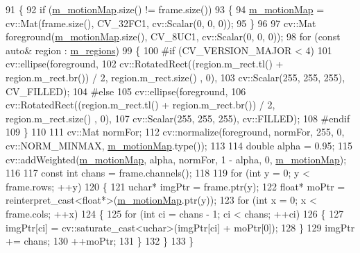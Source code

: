 \begin{DoxyCode}
91     \{
92         \textcolor{keywordflow}{if} (\mbox{\hyperlink{class_base_detector_a45a2d54a0b69e271aa5c44ee301682b7}{m\_motionMap}}.size() != frame.size())
93         \{
94             \mbox{\hyperlink{class_base_detector_a45a2d54a0b69e271aa5c44ee301682b7}{m\_motionMap}} = cv::Mat(frame.size(), CV\_32FC1, cv::Scalar(0, 0, 0));
95         \}
96 
97         cv::Mat foreground(\mbox{\hyperlink{class_base_detector_a45a2d54a0b69e271aa5c44ee301682b7}{m\_motionMap}}.size(), CV\_8UC1, cv::Scalar(0, 0, 0));
98         \textcolor{keywordflow}{for} (\textcolor{keyword}{const} \textcolor{keyword}{auto}& region : \mbox{\hyperlink{class_base_detector_a409c20093acba261db8354ca72058fce}{m\_regions}})
99         \{
100 \textcolor{preprocessor}{#if (CV\_VERSION\_MAJOR < 4)}
101             cv::ellipse(foreground,
102                         cv::RotatedRect((region.m\_rect.tl() + region.m\_rect.br()) / 2, region.m\_rect.size()
      , 0),
103                                         cv::Scalar(255, 255, 255), CV\_FILLED);
104 \textcolor{preprocessor}{#else}
105             cv::ellipse(foreground,
106                         cv::RotatedRect((region.m\_rect.tl() + region.m\_rect.br()) / 2, region.m\_rect.size()
      , 0),
107                                         cv::Scalar(255, 255, 255), cv::FILLED);
108 \textcolor{preprocessor}{#endif}
109         \}
110 
111         cv::Mat normFor;
112         cv::normalize(foreground, normFor, 255, 0, cv::NORM\_MINMAX, \mbox{\hyperlink{class_base_detector_a45a2d54a0b69e271aa5c44ee301682b7}{m\_motionMap}}.type());
113 
114         \textcolor{keywordtype}{double} alpha = 0.95;
115         cv::addWeighted(\mbox{\hyperlink{class_base_detector_a45a2d54a0b69e271aa5c44ee301682b7}{m\_motionMap}}, alpha, normFor, 1 - alpha, 0, 
      \mbox{\hyperlink{class_base_detector_a45a2d54a0b69e271aa5c44ee301682b7}{m\_motionMap}});
116 
117         \textcolor{keyword}{const} \textcolor{keywordtype}{int} chans = frame.channels();
118 
119         \textcolor{keywordflow}{for} (\textcolor{keywordtype}{int} y = 0; y < frame.rows; ++y)
120         \{
121             uchar* imgPtr = frame.ptr(y);
122             \textcolor{keywordtype}{float}* moPtr = \textcolor{keyword}{reinterpret\_cast<}\textcolor{keywordtype}{float}*\textcolor{keyword}{>}(\mbox{\hyperlink{class_base_detector_a45a2d54a0b69e271aa5c44ee301682b7}{m\_motionMap}}.ptr(y));
123             \textcolor{keywordflow}{for} (\textcolor{keywordtype}{int} x = 0; x < frame.cols; ++x)
124             \{
125                 \textcolor{keywordflow}{for} (\textcolor{keywordtype}{int} ci = chans - 1; ci < chans; ++ci)
126                 \{
127                     imgPtr[ci] = cv::saturate\_cast<uchar>(imgPtr[ci] + moPtr[0]);
128                 \}
129                 imgPtr += chans;
130                 ++moPtr;
131             \}
132         \}
133     \}
\end{DoxyCode}
\mbox{\label{class_base_detector_a20380b0980c6f262b0829f37fb89d2a7}} 
